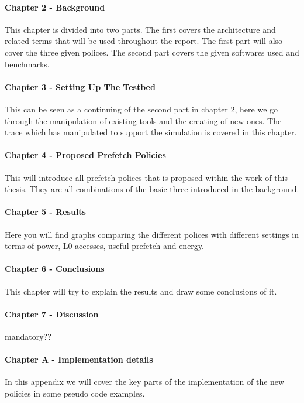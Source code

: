 \paragraph{Chapter 2 - Background} This chapter is divided into two parts. The first covers
the architecture and related terms that will be used throughout the report. The first
part will also cover the three given polices. The second part covers the given softwares
used and benchmarks.
\paragraph{Chapter 3 - Setting Up The Testbed} This can be seen as a continuing of the
second part in chapter 2, here we go through the manipulation of existing tools and
the creating of new ones. The trace which has manipulated to support the simulation
is covered in this chapter.
\paragraph{Chapter 4 - Proposed Prefetch Policies} This will introduce all prefetch polices
that is proposed within the work of this thesis. They are all combinations of the basic
three introduced in the background.
\paragraph{Chapter 5 - Results} Here you will find graphs comparing the different polices
with different settings in terms of power, L0 accesses, useful prefetch and energy.
\paragraph{Chapter 6 - Conclusions} This chapter will try to explain the results and draw
some conclusions of it.
\paragraph{Chapter 7 - Discussion} mandatory??
\paragraph{Chapter A - Implementation details} In this appendix we will cover the key
parts of the implementation of the new policies in some pseudo code examples.